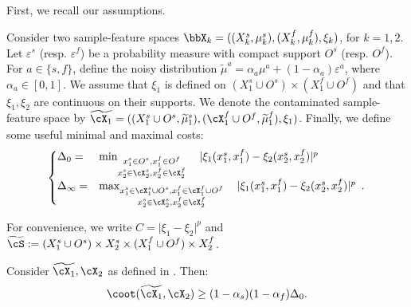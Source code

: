 First, we recall our assumptions.
\begin{assumption}
\label{assump:robust_copy}
Consider two sample-feature spaces
$\bbX_k = ((X^s_k, \mu^s_k), (X^f_k, \mu^f_k), \xi_k)$, for $k=1,2$.
Let $\varepsilon^s$ (resp. $\varepsilon^f$) be a probability measure with compact support $O^s$
(resp. $O^f$). For $a \in \{s, f\}$, define the noisy distribution
$\widetilde{\mu}^a = \alpha_a \mu^a + (1-\alpha_a) \varepsilon^a$, where $\alpha_a \in [0,1]$.
We assume that $\xi_1$ is defined on
$(X^s_1 \cup O^s) \times (X^f_1 \cup O^f)$ and that $\xi_1, \xi_2$
are continuous on their supports. We denote the contaminated sample-feature space by
$\widetilde{\cX_1} = ((X^s_1 \cup O^s, \widetilde{\mu}^s_1),
(\cX^f_1 \cup O^f, \widetilde{\mu}^f_1), \xi_1)$. Finally,
we define some useful minimal and maximal costs:
  \[
  \begin{cases}
  \Delta_{0} =& \min_{
  \substack{
       x_1^s \in O^s, x_1^f \in O^f  \\
       x_2^s \in \cX_2^s, x_2^f \in \cX_2^f
  }}\quad |\xi_1(x_1^s, x_1^f) - \xi_2(x_2^s, x_2^f)|^p \\
  \Delta_{\infty} =& \max_{
  \substack{
  x_1^s \in \cX_1^s \cup O^s, x_1^f \in \cX_1^f \cup O^f \\
  x_2^s \in \cX_2^s, x_2^f \in \cX_2^f
  }} \quad|\xi_1(x_1^s, x_1^f) - \xi_2(x_2^s, x_2^f)|^p \enspace.
  \end{cases}
\]
\end{assumption}
For convenience, we write $C = \vert \xi_1 - \xi_2 \vert^p$ and
$\widetilde{\cS} := (X^s_1 \cup O^s) \times X_2^s \times (X^f_1 \cup O^f) \times X_2^f$.
\begin{proposition}
Consider $\widetilde{\cX_1}, \cX_2$ as defined in .
Then:
 \label{prop:coot-not-robust_copy}
\begin{equation*}
    \coot(\widetilde{\cX_1}, \cX_2) \geq (1 - \alpha_s)(1-\alpha_f) \Delta_0.
\end{equation*}
\end{proposition}

